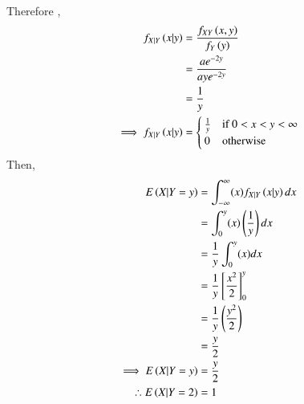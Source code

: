 Therefore ,
\begin{align}
    f_{X|Y}\left(x|y\right) &= \frac{f_{XY}\left(x,y\right)}{f_Y\left(y\right)}\\
    & = \frac{ae^{-2y}}{aye^{-2y}}\\
    & = \frac{1}{y}\\
\implies f_{X|Y}\left(x|y\right) &=
    \begin{cases}
    \frac{1}{y} & \text{if } 0<x<y<\infty\\
    0 & \text{otherwise}
    \end{cases}
\end{align}
Then, 
\begin{align}
   E\left(X|Y=y\right) & =
   \int_{-\infty}^{\infty} (x)f_{X|Y}\left(x|y\right)dx\\
    & = \int_{0}^{y}(x)\left(\frac{1}{y}\right)dx\\
    & = \frac{1}{y} \int_{0}^{y}(x)dx \\
    & = \frac{1}{y} \left[ \frac{x^2}{2}\right]_{0}^{y}\\
    & = \frac{1}{y}\left(\frac{y^2}{2}\right)\\
    & = \frac{y}{2}\\
\implies E\left(X|Y=y\right) &= \frac{y}{2}\\
\therefore E\left(X|Y=2\right) &= 1
\end{align}